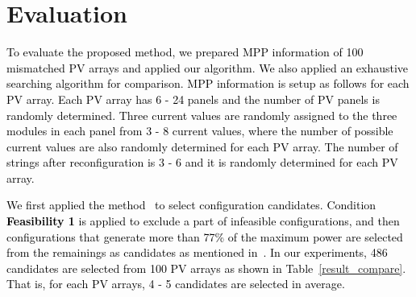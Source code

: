 \documentclass[conference]{pvsctran}
\newcommand{\michiko}{\textcolor{black}}
\newcommand{\zhao}{\textcolor{black}}
\begin{document}
\section{Evaluation}\label{Sec6}

\michiko{To evaluate the proposed method, we prepared MPP information of 100 mismatched PV arrays and applied our algorithm. We also applied an exhaustive searching algorithm for comparison.
MPP information is setup as follows for each PV array. 
Each PV array has 6 - 24  panels and the number of PV panels is randomly determined. 
Three current values are randomly assigned to the three modules in each panel from 3 - 8 current values, where the number of possible current values are also randomly determined for each PV array.
The number of strings after reconfiguration is 3 - 6 and it is randomly determined for each PV array.}

\michiko{We first applied the method~\cite{orozco2016optimized} to select configuration candidates. Condition \textbf{Feasibility 1} is applied to exclude a part of infeasible configurations, and then configurations that generate more than 77\% of the maximum power are selected from the remainings as candidates as mentioned in~\cite{orozco2016optimized}.  In our experiments, 486 candidates are selected from 100 PV arrays as shown in Table~\ref{result_compare}. That is, for each PV arrays, 4 - 5 candidates are selected in average.}
\end{document}
